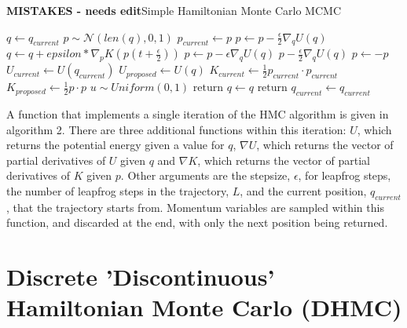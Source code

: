 \documentclass[]{report}
\begin{document}
\begin{algorithm}
	\label{alg:simpHMC}
	\caption{\textbf{MISTAKES - needs edit}Simple Hamiltonian Monte Carlo MCMC}
	\begin{algorithmic}[1]
		\State $ q \gets q_{current}$
		\State $ p \sim \mathcal{N}(len(q),0,1)$
		\State $ p_{current} \gets p$
		\State $ p \gets p - \frac{\epsilon}{2}\nabla_{q} U(q)$  
		\State $q \gets q + epsilon * \nabla_{p} K (p(t + \frac{\epsilon}{2}))$  
		\State $p \gets p- \epsilon \nabla_{q} U(q)$
		\EndIf
		\EndFor
		\State $p - \frac{\epsilon}{2}\nabla_{q} U(q)$ 
		\State $p \gets - p$ 
		\State $U_{current} \gets U(q_{current})$
		\State $U_{proposed} \gets U(q)$
		\State $K_{current} \gets \frac{1}{2} p_{current} \cdot p_{current} $
		\State $K_{proposed} \gets \frac{1}{2} p \cdot p$
		\State $ u \sim Uniform(0,1)$
		\State $\text{return } q \gets q$ 
		\Else
		\State $\text{return } q_{current} \gets q_{current}$ 
		\EndIf
	\end{algorithmic} 
\end{algorithm}
A function that implements a single iteration of the HMC algorithm is given in algorithm 2. There are three additional functions within this iteration: $U$, which returns the potential energy given a value for $q$,  $\nabla U$, which returns the vector of partial derivatives of $U$ given $q$ and $\nabla K$, which returns the vector of partial derivatives of $K$ given $p$. Other arguments are the stepsize, $\epsilon$, for leapfrog steps, the number of leapfrog steps in the trajectory, $L$, and the current position, $q_{current}$, that the trajectory starts from. Momentum variables are sampled within this function, and discarded at the end, with only the next position being returned. 

\section{Discrete 'Discontinuous' Hamiltonian Monte Carlo (DHMC)}
\end{document}
